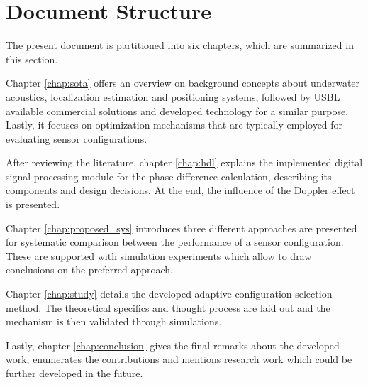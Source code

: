 \section{Document Structure} \label{sec:doc-struct}

The present document is partitioned into six chapters, which are summarized in this section.

Chapter \ref{chap:sota} offers an overview on background concepts about underwater acoustics, localization estimation and positioning systems, followed by USBL available commercial solutions and developed technology for a similar purpose. Lastly, it focuses on optimization mechanisms that are typically employed for evaluating sensor configurations.

After reviewing the literature, chapter \ref{chap:hdl} explains the implemented digital signal processing module for the phase difference calculation, describing its components and design decisions. At the end, the influence of the Doppler effect is presented.

Chapter \ref{chap:proposed_sys} introduces three different approaches are presented for systematic comparison between the performance of a sensor configuration. These are supported with simulation experiments which allow to draw conclusions on the preferred approach.

Chapter \ref{chap:study} details the developed adaptive configuration selection method. The theoretical specifics and thought process are laid out and the mechanism is then validated through simulations.

Lastly, chapter \ref{chap:conclusion} gives the final remarks about the developed work, enumerates the contributions and mentions research work which could be further developed in the future.  
